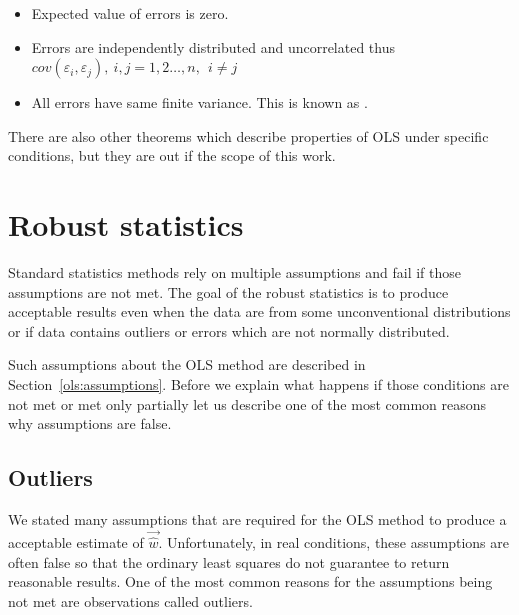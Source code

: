 \begin{itemize} \label{ols:assumptions}
  \item Expected value of errors is zero.
  \item Errors are independently distributed and uncorrelated thus \\ $cov(\varepsilon_i, \varepsilon_j), \ i, j = 1, 2 \ldots , n, \ \ i \neq j$
 \item All errors have same finite variance. This is known as .
\end{itemize}


There are also other theorems which describe properties of OLS under specific conditions, but they are out if the scope of this work.



\section{Robust statistics} \label{section:roboust}
Standard statistics methods rely on multiple assumptions and fail if those assumptions are not met. The goal of the robust statistics is to produce acceptable results even when the data are from some unconventional distributions or if data contains outliers or errors which are not normally distributed. 

Such assumptions about the OLS method are described in Section~\ref{ols:assumptions}. Before we explain what happens if those conditions are not met or met only partially let us describe one of the most common reasons why assumptions are false.

\subsection{Outliers} \label{outliers:info}
We stated many assumptions that are required for the OLS method to produce a acceptable estimate of $\vec{\hat{w}}$. Unfortunately, in real conditions, these assumptions are often false so that the ordinary least squares do not guarantee to return reasonable results. One of the most common reasons for the assumptions being not met are observations called outliers.

